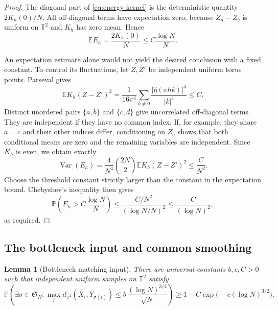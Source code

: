 \documentclass[11pt]{article}
\newcommand{\Pbb}{\mathbb P}
\newcommand{\Ebb}{\mathbb E}
\newcommand{\T}{\mathbb T^2}
\newcommand{\Var}{\operatorname{Var}}
\newtheorem{lemma}[theorem]{Lemma}
\theoremstyle{remark}
\numberwithin{equation}{section}
\begin{document}
\begin{proof}
The diagonal part of \eqref{eq:energy-kernel} is the deterministic
quantity \(2K_h(0)/N\). All off-diagonal terms have expectation
zero, because \(Z_a-Z_b\) is uniform on \(\T\) and \(K_h\) has
zero mean. Hence
\[
 \Ebb E_h=\frac{2K_h(0)}N
 \le C\frac{\log N}{N}.
\]

An expectation estimate alone would not yield the desired conclusion
with a fixed constant. To control its fluctuations, let \(Z,Z'\)
be independent uniform torus points. Parseval gives
\[
 \Ebb K_h(Z-Z')^2
 =\frac1{16\pi^4}
 \sum_{k\ne0}\frac{|\widehat\eta(\pi hk)|^4}{|k|^4}
 \le C.
\]
Distinct unordered pairs \(\{a,b\}\) and \(\{c,d\}\) give
uncorrelated off-diagonal terms. They are independent if they
have no common index. If, for example, they share \(a=c\)
and their other indices differ, conditioning on \(Z_a\) shows
that both conditional means are zero and the remaining variables
are independent. Since \(K_h\) is even, we obtain exactly
\[
 \Var(E_h)
 =\frac4{N^4}\binom{2N}{2}\Ebb K_h(Z-Z')^2
 \le \frac C{N^2}.
\]
Choose the threshold constant strictly larger than the constant in
the expectation bound. Chebyshev's inequality then gives
\[
 \Pbb\left(E_h>C\frac{\log N}{N}\right)
 \le\frac{C/N^2}{(\log N/N)^2}
 \le\frac C{(\log N)^2},
\]
as required.
\end{proof}

\subsection{The bottleneck input and common smoothing}

\begin{lemma}[Bottleneck matching input]
\label{lem:bottleneck}
There are universal constants \(b,c,C>0\) such that independent
uniform samples on \(\T\) satisfy
\[
 \Pbb\left(
 \exists \sigma\in\mathfrak S_N:
 \max_i d_{\T}(X_i,Y_{\sigma(i)})
 \le b\,\frac{(\log N)^{3/4}}{\sqrt N}
 \right)
 \ge1-C\exp\bigl(-c(\log N)^{3/2}\bigr).
\]
\end{lemma}
\end{document}

